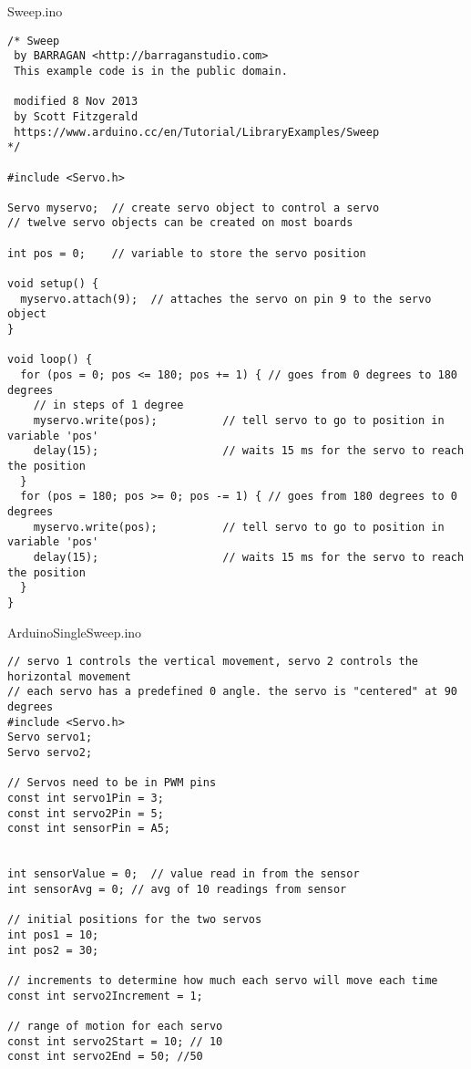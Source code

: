 \documentclass{article}
\begin{document}
\begin{tcolorbox}
Sweep.ino
\begin{verbatim}
/* Sweep
 by BARRAGAN <http://barraganstudio.com>
 This example code is in the public domain.

 modified 8 Nov 2013
 by Scott Fitzgerald
 https://www.arduino.cc/en/Tutorial/LibraryExamples/Sweep
*/

#include <Servo.h>

Servo myservo;  // create servo object to control a servo
// twelve servo objects can be created on most boards

int pos = 0;    // variable to store the servo position

void setup() {
  myservo.attach(9);  // attaches the servo on pin 9 to the servo object
}

void loop() {
  for (pos = 0; pos <= 180; pos += 1) { // goes from 0 degrees to 180 degrees
    // in steps of 1 degree
    myservo.write(pos);          // tell servo to go to position in variable 'pos'
    delay(15);                   // waits 15 ms for the servo to reach the position
  }
  for (pos = 180; pos >= 0; pos -= 1) { // goes from 180 degrees to 0 degrees
    myservo.write(pos);          // tell servo to go to position in variable 'pos'
    delay(15);                   // waits 15 ms for the servo to reach the position
  }
}
\end{verbatim}
\end{tcolorbox}


\begin{tcolorbox}
ArduinoSingleSweep.ino
\begin{verbatim}
// servo 1 controls the vertical movement, servo 2 controls the horizontal movement
// each servo has a predefined 0 angle. the servo is "centered" at 90 degrees
#include <Servo.h>
Servo servo1;
Servo servo2;

// Servos need to be in PWM pins
const int servo1Pin = 3;
const int servo2Pin = 5;
const int sensorPin = A5;


int sensorValue = 0;  // value read in from the sensor
int sensorAvg = 0; // avg of 10 readings from sensor

// initial positions for the two servos
int pos1 = 10;
int pos2 = 30;

// increments to determine how much each servo will move each time
const int servo2Increment = 1;

// range of motion for each servo
const int servo2Start = 10; // 10
const int servo2End = 50; //50
\end{verbatim}
\end{tcolorbox}
\end{document}
